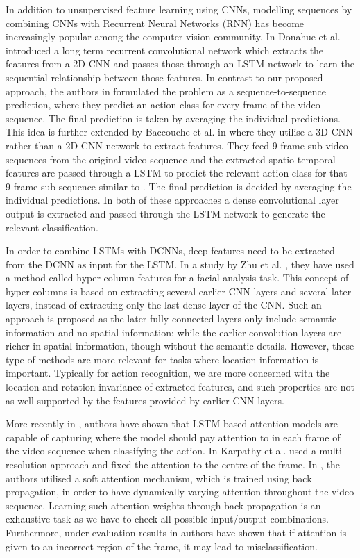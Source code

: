 \documentclass[10pt,twocolumn,letterpaper]{article}
\begin{document}
	
		 In addition to unsupervised feature learning using CNNs, modelling sequences by combining CNNs with Recurrent Neural Networks (RNN) has become increasingly popular among the computer vision community. In \cite{Jeff2015} Donahue et al. introduced a long term recurrent convolutional network which extracts the features from a 2D CNN and passes those through an LSTM network to learn the sequential relationship between those features. In contrast to our proposed approach, the authors in \cite{Jeff2015} formulated the problem as a sequence-to-sequence prediction, where they predict an action class for every frame of the video sequence. The final prediction is taken by averaging the individual predictions. This idea is further extended by Baccouche et al. in \cite{Baccouche2011} where they utilise a 3D CNN rather than a 2D CNN network to extract features. They feed 9 frame sub video sequences from the original video sequence and the extracted spatio-temporal features are passed through a LSTM to predict the relevant action class for that 9 frame sub sequence similar to \cite{Jeff2015}. The final prediction is decided by averaging the individual predictions. In both of these approaches a dense convolutional layer output is extracted and passed through the LSTM network to generate the relevant classification.  
		      
		 
		 In order to combine LSTMs with DCNNs, deep features need to be extracted from the DCNN as input for the LSTM. In a study by Zhu et al. \cite{Zhu2016}, they have used a method called hyper-column features for a facial analysis task. This concept of hyper-columns is based on extracting several earlier CNN layers and several later layers, instead of extracting only the last dense layer of the CNN. Such an approach is proposed as the later fully connected layers only include semantic information and no spatial information; while the earlier convolution layers are richer in spatial information, though without the semantic details. However, these type of methods are more relevant for tasks where location information is important. Typically for action recognition, we are more concerned with the location and rotation invariance of extracted features, and such properties are not as well supported by the features provided by earlier CNN layers.


	
	More recently in \cite{Sharma2015,Yao2015}, authors have shown that LSTM based attention models are capable of capturing where the model should pay attention to in each frame of the video sequence when classifying the action. In \cite{Karpathy2014} Karpathy et al. used a multi resolution approach and fixed the attention to the centre of the frame. In \cite{Sharma2015}, the authors utilised a soft attention mechanism, which is trained using back propagation, in order to have dynamically varying attention throughout the video sequence. Learning such attention weights through back propagation is an exhaustive task as we have to check all possible input/output combinations. Furthermore, under evaluation results in \cite{Sharma2015} authors have shown that if attention is given to an incorrect region of the frame, it may lead to misclassification. 
	
\end{document}
